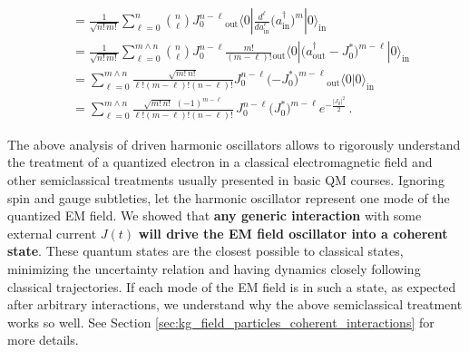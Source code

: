\documentclass[../QFT_main.tex]{subfiles}
\begin{document}
\begin{mytheorem}
{\begin{align}
    &= \frac{1}{\sqrt{n!\,m!}}\sum_{\ell=0}^n \binom{n}{\ell} J_0^{n-\ell} {}_{\mathrm{out}}\langle 0 | \frac{d^\ell}{da_{\mathrm{in}}^\ell}(a_{\mathrm{in}}^\dagger\big)^m |0\rangle_{\mathrm{in}}\\
    &= \frac{1}{\sqrt{n!\,m!}}\sum_{\ell=0}^{m\wedge n} \binom{n}{\ell} J_0^{n-\ell} \frac{m!}{(m-\ell)!}{}_{\mathrm{out}}\langle 0 |(a_{\mathrm{out}}^\dagger-J_0^*\big)^{m-\ell} |0\rangle_{\mathrm{in}}\\
    &= \sum_{\ell=0}^{m\wedge n} \frac{\sqrt{m!\,n!}}{\ell!(m-\ell)!(n-\ell)!}J_0^{n-\ell} (-J_0^*\big)^{m-\ell}{}_{\mathrm{out}}\langle 0 |0\rangle_{\mathrm{in}}\\
    &=\sum_{\ell=0}^{m\wedge n} \frac{\sqrt{m!\,n!}\,\, (-1)^{m-\ell}}{\ell!(m-\ell)!(n-\ell)!}\,J_0^{n-\ell} (J_0^*\big)^{m-\ell} e^{-\frac{|J_0|^2}{2}}\,.
\end{align}
}
\end{mytheorem}



\begin{mytheorem}
%
The above analysis of driven harmonic oscillators allows to rigorously understand the treatment of a quantized electron in a classical electromagnetic field and other semiclassical treatments usually presented in basic QM courses.
Ignoring spin and gauge subtleties, let the harmonic oscillator represent one mode of the quantized EM field.
We showed that \textbf{any generic interaction} with some external current $J(t)$ \textbf{will drive the EM field oscillator into a coherent state}.
These quantum states are the closest possible to classical states, minimizing the uncertainty relation and having dynamics closely following classical trajectories.
If each mode of the EM field is in such a state, as expected after arbitrary interactions, we understand why the above semiclassical treatment works so well.
See Section \ref{sec:kg_field_particles_coherent_interactions} for more details.
%
\end{mytheorem}


\end{document}
